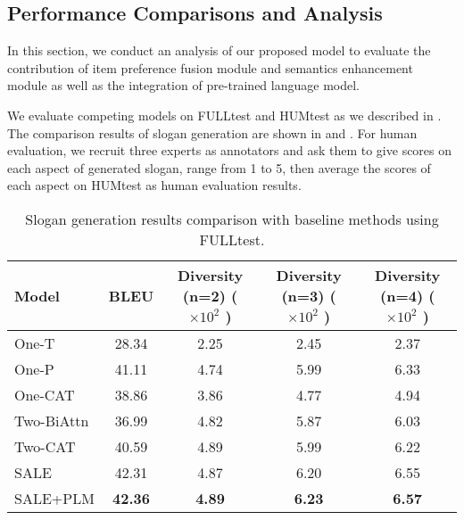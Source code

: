 \subsection{Performance Comparisons and Analysis}
\label{sec:results}


In this section, we conduct an analysis of our proposed model
to evaluate the contribution of item preference fusion module and
semantics enhancement module as well as the integration of 
pre-trained language model.

We evaluate competing models on FULLtest and HUMtest 
as we described in .
The comparison results of slogan generation are shown in 
 and .
For human evaluation, we recruit three experts as annotators 
and ask them to give scores on each aspect of generated slogan, 
range from 1 to 5,
then average the scores of each aspect on HUMtest as 
human evaluation results.


\begin{table*}[th]
	\centering
	\caption{Slogan generation results comparison with baseline methods using FULLtest.}
	\label{tab:auto_eval}
	\begin{tabular}{lcccc}
		\hline
		Model %
		& BLEU &  Diversity (n=2) ($\times 10^2$ )& Diversity (n=3) ($\times 10^2$ ) & Diversity (n=4) ($\times 10^2$ ) \\
		\hline
		One-T %
		&  28.34 &  2.25   &  2.45  &  2.37 \\
		One-P %
		&  41.11 &   4.74 &    5.99 & 6.33 \\
		One-CAT  %
		& 38.86  &  3.86 &  4.77  & 4.94 \\
		Two-BiAttn  %
		& 36.99  &  4.82 &  5.87  &  6.03   \\
		Two-CAT %
		& 40.59  &  4.89 &  5.99  &  6.22 \\
		\hline\hline
		SALE %
		& 42.31  & 4.87  &  6.20 &  6.55  \\
		SALE+PLM %
		& \textbf{42.36}   &  \textbf{4.89} & \textbf{6.23}  &  \textbf{6.57}  \\
		\hline 
	\end{tabular}
\end{table*}



